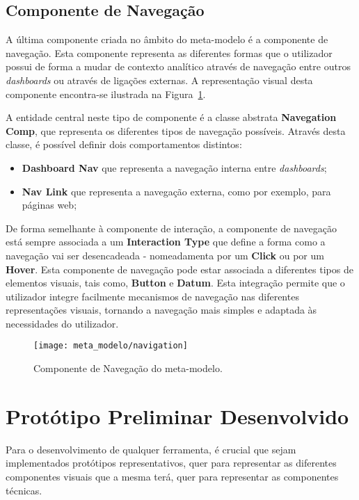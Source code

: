 \subsection{Componente de Navegação} %
\label{sub:nav_diagram}

A última componente criada no âmbito do meta-modelo é a componente de navegação. Esta componente representa as diferentes formas que o utilizador possui de forma a mudar de contexto analítico através de navegação entre outros \textit{dashboards} ou através de ligações externas. A representação visual desta componente encontra-se ilustrada na Figura~\ref{fig:navigation}.

A entidade central neste tipo de componente é a classe abstrata \textbf{Navegation Comp}, que representa os diferentes tipos de navegação possíveis. Através desta classe, é possível definir dois comportamentos distintos:

\begin{itemize}
    \item \textbf{Dashboard Nav} que representa a navegação interna entre \textit{dashboards};
    \item \textbf{Nav Link} que representa a navegação externa, como por exemplo, para páginas web;
\end{itemize}

De forma semelhante à componente de interação, a componente de navegação está sempre associada a um \textbf{Interaction Type} que define a forma como a navegação vai ser desencadeada - nomeadamenta por um \textbf{Click} ou por um \textbf{Hover}. Esta componente de navegação pode estar associada a diferentes tipos de elementos visuais, tais como, \textbf{Button} e \textbf{Datum}. Esta integração permite que o utilizador integre facilmente mecanismos de navegação nas diferentes representações visuais, tornando a navegação mais simples e adaptada às necessidades do utilizador.

\begin{figure}[htbp]
  \texttt{[image: meta\_modelo/navigation]}
  \centering
  \caption{Componente de Navegação do meta-modelo.}
  \label{fig:navigation}
\end{figure}

\section{Protótipo Preliminar Desenvolvido} %
\label{sec:prototipo_preliminar}

Para o desenvolvimento de qualquer ferramenta, é crucial que sejam implementados protótipos representativos, quer para representar as diferentes componentes visuais que a mesma terá, quer para representar as componentes técnicas.

